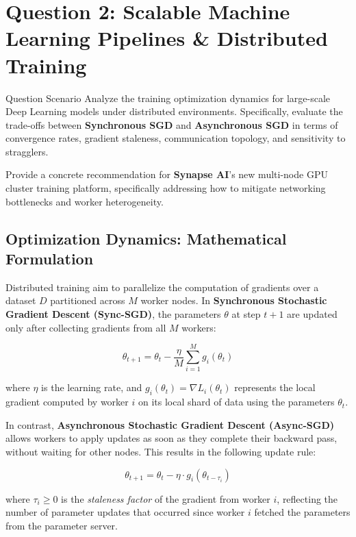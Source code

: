 \section{Question 2: Scalable Machine Learning Pipelines \& Distributed Training}
\label{sec:question2}

\begin{questionbox}{Question Scenario}
  Analyze the training optimization dynamics for large-scale Deep Learning models under distributed environments. Specifically, evaluate the trade-offs between \textbf{Synchronous SGD} and \textbf{Asynchronous SGD} in terms of convergence rates, gradient staleness, communication topology, and sensitivity to stragglers.
  
  Provide a concrete recommendation for \textbf{Synapse AI}'s new multi-node GPU cluster training platform, specifically addressing how to mitigate networking bottlenecks and worker heterogeneity.
\end{questionbox}

\subsection{Optimization Dynamics: Mathematical Formulation}

Distributed training aim to parallelize the computation of gradients over a dataset $D$ partitioned across $M$ worker nodes. In \textbf{Synchronous Stochastic Gradient Descent (Sync-SGD)}, the parameters $\theta$ at step $t+1$ are updated only after collecting gradients from all $M$ workers:

\begin{equation}
  \theta_{t+1} = \theta_t - \frac{\eta}{M} \sum_{i=1}^{M} g_i(\theta_t)
\end{equation}

where $\eta$ is the learning rate, and $g_i(\theta_t) = \nabla L_i(\theta_t)$ represents the local gradient computed by worker $i$ on its local shard of data using the parameters $\theta_t$.

In contrast, \textbf{Asynchronous Stochastic Gradient Descent (Async-SGD)} allows workers to apply updates as soon as they complete their backward pass, without waiting for other nodes. This results in the following update rule:

\begin{equation}
  \theta_{t+1} = \theta_t - \eta \cdot g_i(\theta_{t-\tau_i})
\end{equation}

where $\tau_i \ge 0$ is the \emph{staleness factor} of the gradient from worker $i$, reflecting the number of parameter updates that occurred since worker $i$ fetched the parameters from the parameter server.

